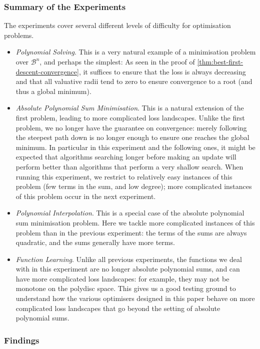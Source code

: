 \documentclass[10pt]{article}
\theoremstyle{definition}
\begin{document}
\subsubsection{Summary of the Experiments}
The experiments cover several different levels of difficulty for optimisation problems.
\begin{itemize}
    \item \emph{Polynomial Solving}. This is a very natural example of a minimisation problem over $\mathcal{B}^n$, and perhaps the simplest: As seen in the proof of \cref{thm:best-first-descent-convergence}, it suffices to ensure that the loss is always decreasing and that all valuative radii tend to zero to ensure convergence to a root (and thus a global minimum).
    \item \emph{Absolute Polynomial Sum Minimisation}. This is a natural extension of the first problem, leading to more complicated loss landscapes. Unlike the first problem, we no longer have the guarantee on convergence: merely following the steepest path down is no longer enough to ensure one reaches the global minimum.
    In particular in this experiment and the following ones, it might be expected that algorithms searching longer before making an update will perform better than algorithms that perform a very shallow search.
    When running this experiment, we restrict to relatively easy instances of this problem (few terms in the sum, and low degree); more complicated instances of this problem occur in the next experiment. 
    \item \emph{Polynomial Interpolation}. This is a special case of the absolute polynomial sum minimisation problem. Here we tackle more complicated instances of this problem than in the previous experiment: the terms of the sums are always quadratic, and the sums generally have more terms. 
    \item \emph{Function Learning}. Unlike all previous experiments, the functions we deal with in this experiment are no longer absolute polynomial sums, and can have more complicated loss landscapes: for example, they may not be monotone on the polydisc space. This gives us a good testing ground to understand how the various optimisers designed in this paper behave on more complicated loss landscapes that go beyond the setting of absolute polynomial sums.
\end{itemize}

\subsubsection{Findings}
\end{document}
